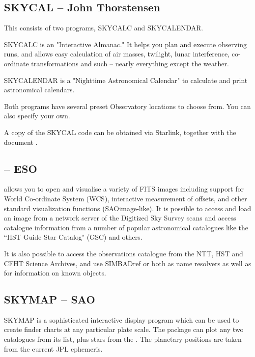 \subsection{SKYCAL -- John Thorstensen} 
\label{sec:skycal}
 
This consists of two programs, SKYCALC and SKYCALENDAR.

SKYCALC is an "Interactive Almanac." It helps you plan and execute observing
runs, and allows easy calculation of air masses, twilight, lunar interference, 
co-ordinate transformations and such -- nearly everything except the weather. 

SKYCALENDAR is a "Nighttime Astronomical Calendar" to calculate and
print astronomical calendars. 

Both programs have several preset Observatory locations to choose from.
You can also specify your own.

A copy of the SKYCAL code can be obtained via Starlink, together with the
document {\SUNSKYref}.

\subsection{{\SKYCATref} -- ESO}  
\label{sec:skycat}
 
{\SKYCATref} allows you to open and visualise a variety of FITS images including
support for World Co-ordinate System (WCS), interactive measurement of offsets,
and other standard visualization functions (SAOimage-like). It is possible to
access and load an image from a network server of the Digitized Sky Survey
scans and access catalogue information from a number of popular astronomical
catalogues like the ``HST Guide Star Catalog" (GSC) and others. 
      
It is also possible to access the observations catalogue from the NTT, HST and
CFHT Science Archives, and use {SIMBADref} or {\NEDref} both as name resolvers as well as
for information on known objects. 


\subsection{SKYMAP -- SAO} 
\label{sec:skymapsao}
 
SKYMAP is a sophisticated interactive display program which can be used to
create finder charts at any particular plate scale.  
The package can plot any
two catalogues from its list, plus stars from the {\GSCref}. The planetary positions
are taken from the current JPL ephemeris. 

